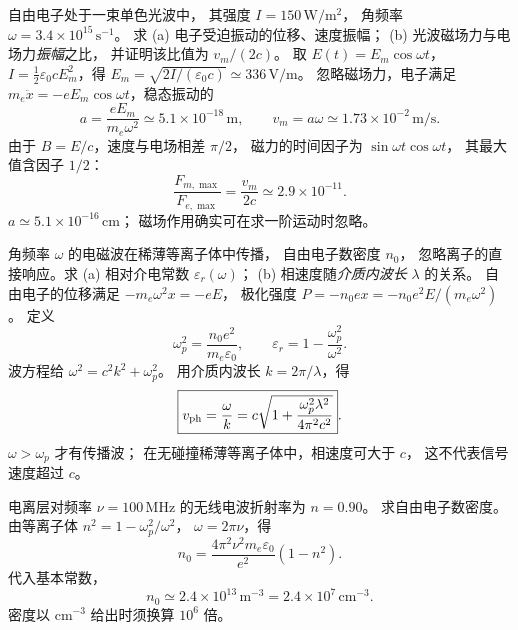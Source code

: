 

自由电子处于一束单色光波中，
其强度 $I=150\,\mathrm{W/m^2}$，
角频率 $\omega=3.4\times10^{15}\,\mathrm{s^{-1}}$。
求 (a) 电子受迫振动的位移、速度振幅；
(b) 光波磁场力与电场力\emph{振幅}之比，
并证明该比值为 $v_m/(2c)$。
\exsolution
取 $E(t)=E_m\cos\omega t$，
$I=\tfrac12\varepsilon_0cE_m^2$，得
$E_m=\sqrt{2I/(\varepsilon_0c)}\simeq336\,\mathrm{V/m}$。
忽略磁场力，电子满足
$m_e\ddot x=-eE_m\cos\omega t$，稳态振动的
\[
 \boxed{a=\frac{eE_m}{m_e\omega^2}
 \simeq5.1\times10^{-18}\,\mathrm m},\qquad
 \boxed{v_m=a\omega
 \simeq1.73\times10^{-2}\,\mathrm{m/s}}.
\]
由于 $B=E/c$，速度与电场相差 $\pi/2$，
磁力的时间因子为 $\sin\omega t\cos\omega t$，
其最大值含因子 $1/2$：
\[
 \boxed{\frac{F_{m,\max}}{F_{e,\max}}
 =\frac{v_m}{2c}\simeq2.9\times10^{-11}}.
\]
\excheck $a\simeq5.1\times10^{-16}\,\mathrm{cm}$；
磁场作用确实可在求一阶运动时忽略。

角频率 $\omega$ 的电磁波在稀薄等离子体中传播，
自由电子数密度 $n_0$，
忽略离子的直接响应。求
(a) 相对介电常数 $\varepsilon_r(\omega)$；
(b) 相速度随\emph{介质内波长} $\lambda$ 的关系。
\exsolution
自由电子的位移满足
$-m_e\omega^2x=-eE$，
极化强度 $P=-n_0ex=-n_0e^2E/(m_e\omega^2)$。
定义
\[
 \omega_p^2=\frac{n_0e^2}{m_e\varepsilon_0},
 \qquad
 \boxed{\varepsilon_r=1-\frac{\omega_p^2}{\omega^2}}.
\]
波方程给 $\omega^2=c^2k^2+\omega_p^2$。
用介质内波长 $k=2\pi/\lambda$，得
\[
 \boxed{v_{\rm ph}=\frac\omega k
 =c\sqrt{1+\frac{\omega_p^2\lambda^2}
 {4\pi^2c^2}}}.
\]
\excheck $\omega>\omega_p$ 才有传播波；
在无碰撞稀薄等离子体中，相速度可大于 $c$，
这不代表信号速度超过 $c$。

电离层对频率 $\nu=100\,\mathrm{MHz}$
的无线电波折射率为 $n=0.90$。
求自由电子数密度。
\exsolution
由等离子体
$n^2=1-\omega_p^2/\omega^2$，
$\omega=2\pi\nu$，得
\[
 \boxed{n_0=
 \frac{4\pi^2\nu^2m_e\varepsilon_0}{e^2}(1-n^2)}.
\]
代入基本常数，
\[
 \boxed{n_0\simeq2.4\times10^{13}\,\mathrm{m^{-3}}
 =2.4\times10^7\,\mathrm{cm^{-3}}}.
\]
\excheck 密度以 $\mathrm{cm^{-3}}$ 给出时须换算 $10^6$ 倍。


